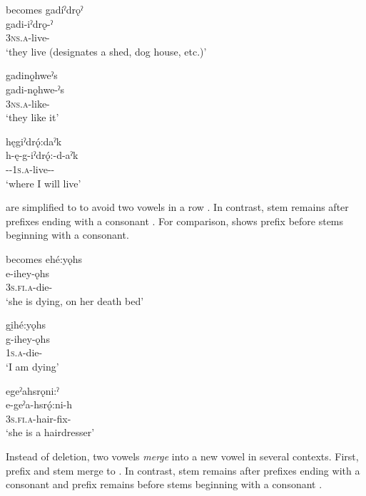 \ea\label{ex:wdsoundchangex5}  becomes 
\ea gadíˀdrǫˀ\\\label{ex:wdsoundchangex5a}
\gll gadi-iˀdrǫ-ˀ\\
\textsc{3ns.a}-live-{\stative}\\
\glt ‘they live (designates a shed, dog house, etc.)’

\ex gadinǫ̱hweˀs\\\label{ex:wdsoundchangex5b}
\gll gadi-nǫ̱hwe-ˀs\\
 \textsc{3ns.a}-like-{\habitual}\\
\glt `they like it'

\ex hęgiˀdrǫ́:daˀk\\\label{ex:wdsoundchangex5c}
\gll h-ę-g-iˀdrǫ́:-d-aˀk\\
 {\translocative}-{\future}-\textsc{1s.a}-live-{\causative}-{\modalizer} \\
\glt `where I will live'
\z
\z

 are simplified to  to avoid two vowels in a row . In contrast, stem  remains after prefixes ending with a consonant . For comparison,  shows prefix  before stems beginning with a consonant.

\ea\label{ex:wdsoundchangex6}  becomes 
\ea ehé:yǫhs\\\label{ex:wdsoundchangex6a}
\gll e-ihey-ǫhs\\
 \textsc{3s.fi.a}-die-{\habitual} \\
\glt `she is dying, on her death bed'

\ex gi̱hé:yǫhs\\\label{ex:wdsoundchangex6b}
\gll g-ihey-ǫhs\\
 \textsc{1s.a}-die-{\habitual}\\
\glt `I am dying'

\ex egeˀahsrǫni:ˀ\\\label{ex:wdsoundchangex6c}
\gll e-geˀa-hsrǫ́:ni-h\\
 \textsc{3s.fi.a}-hair-fix-{\habitual}\\
\glt `she is a hairdresser'
\z
\z

Instead of deletion, two vowels \emph{merge} into a new vowel in several contexts. First, prefix  and stem  merge to  . In contrast, stem  remains after prefixes ending with a consonant  and prefix  remains before stems beginning with a consonant . 

